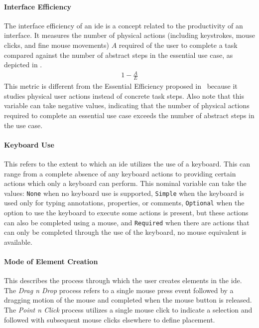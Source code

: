 \paragraph{Interface Efficiency}
The interface efficiency of an \ac{ide} is a concept related to the productivity of an interface.
It measures the number of physical actions (including keystrokes, mouse clicks, and fine mouse movements) $A$ required of the user to complete a task compared against the number of abstract steps in the essential use case, as depicted in .
%
\begin{align}\label{eq:iefficiency}
  1 - \frac{A}{E}
\end{align}
%
This metric is different from the Essential Efficiency proposed in~\cite{constantine1996} because it studies physical user actions instead of concrete task steps.
Also note that this variable can take negative values, indicating that the number of physical actions required to complete an essential use case exceeds the number of abstract steps in the use case.


\paragraph{Keyboard Use}
This refers to the extent to which an \ac{ide} utilizes the use of a keyboard.
This can range from a complete absence of any keyboard actions to providing certain actions which only a keyboard can perform.
This nominal variable can take the values:
\texttt{None} when no keyboard use is supported,
\texttt{Simple} when the keyboard is used only for typing annotations, properties, or comments,
\texttt{Optional} when the option to use the keyboard to execute some actions is present, but these actions can also be completed using a mouse,
and \texttt{Required} when there are actions that can only be completed through the use of the keyboard, no mouse equivalent is available.


\paragraph{Mode of Element Creation} This describes the process through
which the user creates elements in the \ac{ide}. The \emph{Drag n Drop} process
refers to a single mouse press event followed by a dragging motion of the
mouse and completed when the mouse button is released. The \emph{Point n
Click} process utilizes a single mouse click to indicate a selection and
followed with subsequent mouse clicks elsewhere to define placement.


